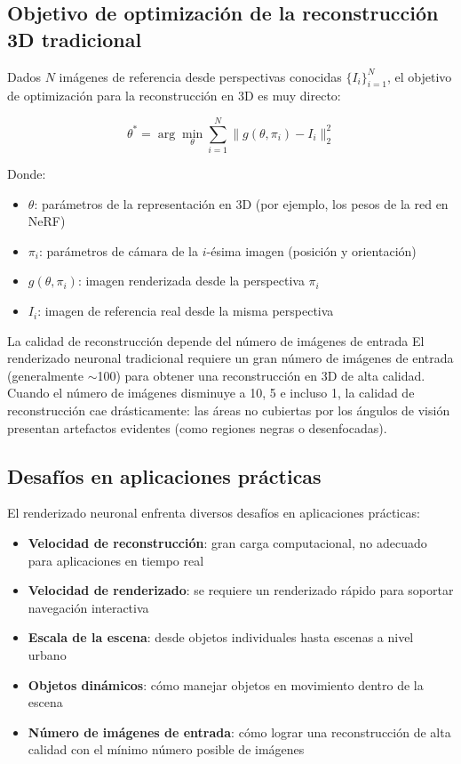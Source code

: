 \documentclass[a4paper]{article}
\begin{document}
\subsection{Objetivo de optimización de la reconstrucción 3D tradicional}

Dados $N$ imágenes de referencia desde perspectivas conocidas $\{I_i\}_{i=1}^{N}$, el objetivo de optimización para la reconstrucción en 3D es muy directo:

$$
\theta^* = \arg\min_{\theta} \sum_{i=1}^{N} \| g(\theta, \pi_i) - I_i \|_2^2
$$

Donde:
\begin{itemize}
    \item $\theta$: parámetros de la representación en 3D (por ejemplo, los pesos de la red en NeRF)
    \item $\pi_i$: parámetros de cámara de la $i$-ésima imagen (posición y orientación)
    \item $g(\theta, \pi_i)$: imagen renderizada desde la perspectiva $\pi_i$
    \item $I_i$: imagen de referencia real desde la misma perspectiva
\end{itemize}

\begin{warningbox}{La calidad de reconstrucción depende del número de imágenes de entrada}
El renderizado neuronal tradicional requiere un gran número de imágenes de entrada (generalmente $\sim$100) para obtener una reconstrucción en 3D de alta calidad. Cuando el número de imágenes disminuye a 10, 5 e incluso 1, la calidad de reconstrucción cae drásticamente: las áreas no cubiertas por los ángulos de visión presentan artefactos evidentes (como regiones negras o desenfocadas).
\end{warningbox}

\subsection{Desafíos en aplicaciones prácticas}

El renderizado neuronal enfrenta diversos desafíos en aplicaciones prácticas:

\begin{itemize}
    \item \textbf{Velocidad de reconstrucción}: gran carga computacional, no adecuado para aplicaciones en tiempo real
    \item \textbf{Velocidad de renderizado}: se requiere un renderizado rápido para soportar navegación interactiva
    \item \textbf{Escala de la escena}: desde objetos individuales hasta escenas a nivel urbano
    \item \textbf{Objetos dinámicos}: cómo manejar objetos en movimiento dentro de la escena
    \item \textbf{Número de imágenes de entrada}: cómo lograr una reconstrucción de alta calidad con el mínimo número posible de imágenes
\end{itemize}
\end{document}
